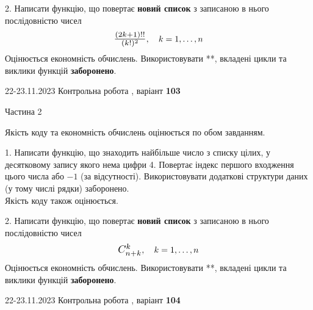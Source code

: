 \documentclass[12pt, ukrainian]{article}
\begin{document}
{{\begin {Large}
\vspace{10mm}



2. 
Написати функцію, що повертає \textbf{новий список} з записаною в нього послідовністю чисел
$$\scalebox{1.2}{$\frac{(2k+1)!!}{(k!)^2}$}, \quad k=1,\ldots,n$$
Оцінюється економність обчислень. Використовувати **, вкладені цикли та виклики функцій \textbf{заборонено}.

\end{Large}\newpage




\begin {Huge}
{{22-23.11.2023 Контрольна робота , варіант  \No \textbf { 103 }\par}}

\begin{center}Частина 2
\end{center}
\vspace{10mm}
\end {Huge}

{
\begin {Large}
Якість коду та економність обчислень оцінюється по обом завданням.

\vspace{5mm}

1. Написати функцію, що знаходить найбільше число з списку цілих, у десятковому запису якого нема цифри 4. Повертає індекс першого входження цього числа або $-1$ (за відсутності). Використовувати додаткові структури даних (у тому числі рядки) заборонено.\\	Якість коду також оцінюється. 



\vspace{10mm}



2. 
Написати функцію, що повертає \textbf{новий список} з записаною в нього послідовністю чисел
$$\scalebox{1.2}{$C_{n+k}^{k}$}, \quad k=1,\ldots,n$$
Оцінюється економність обчислень. Використовувати **, вкладені цикли та виклики функцій \textbf{заборонено}.

\end{Large}\newpage




\begin {Huge}
{{22-23.11.2023 Контрольна робота , варіант  \No \textbf { 104 }\par}}


\end{Huge}}}}
\end{document}
